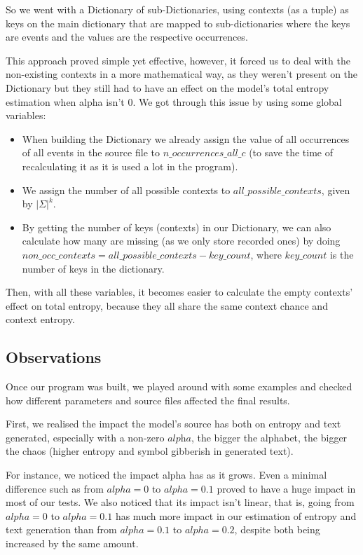 \documentclass{article}
\begin{document}
		So we went with a Dictionary of sub-Dictionaries, using contexts (as a tuple) as keys on the main dictionary that are mapped to sub-dictionaries where the keys are events and the values are the respective occurrences.
	
		This approach proved simple yet effective, however, it forced us to deal with the non-existing contexts in a more mathematical way, as they weren't present on the Dictionary but they still had to have an effect on the model's total entropy estimation when alpha isn't 0. We got through this issue by using some global variables: 
	\begin{itemize}
		\item When building the Dictionary we already assign the value of all occurrences of all events in the source file to $\textit{n\_occurrences\_all\_c}$ (to save the time of recalculating it as it is used a lot in the program).
		
		\item We assign the number of all possible contexts to $\textit{all\_possible\_contexts}$, given by $|\Sigma|^k$.
		
		\item By getting the number of keys (contexts) in our Dictionary, we can also calculate how many are missing (as we only store recorded ones) by doing $\textit{non\_occ\_contexts}=\textit{all\_possible\_contexts}-\textit{key\_count}$, where $\textit{key\_count}$ is the number of keys in the dictionary. 		
	\end{itemize}
		Then, with all these variables, it becomes easier to calculate the empty contexts' effect on total entropy, because they all share the same context chance and context entropy. 
	\subsection{Observations}
		Once our program was built, we played around with some examples and checked how different parameters and source files affected the final results.
		
		First, we realised the impact the model's source has both on entropy and text generated, especially with a non-zero $\textit{alpha}$, the bigger the alphabet, the bigger the chaos (higher entropy and symbol gibberish in generated text). 
		
		For instance, we noticed the impact alpha has as it grows.
		Even a minimal difference such as from $alpha=0$ to $alpha=0.1$ proved to have a huge impact in most of our tests. We also noticed that its impact isn't linear, that is, going from $alpha=0$ to $alpha=0.1$ has much more impact in our estimation of entropy and text generation than from $alpha=0.1$ to $alpha=0.2$, despite both being increased by the same amount.
		
\end{document}
